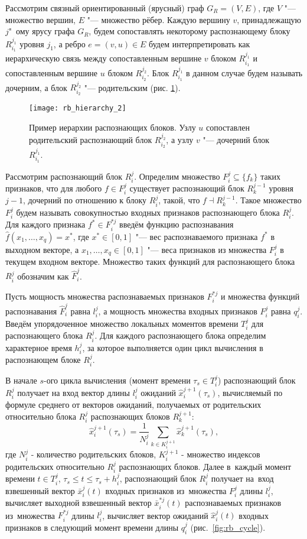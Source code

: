 Рассмотрим связный ориентированный (ярусный) граф $G_R=(V,E)$, где $V$ "--- множество вершин, $E$ "--- множество рёбер. Каждую вершину $v$, принадлежащую $j$"~ому ярусу графа $G_R$, будем сопоставлять некоторому распознающему блоку $R_{i_1}^{j_1}$ уровня $j_1$, а ребро $e=(v,u){\in}E$ будем интерпретировать как иерархическую связь между сопоставленным вершине $v$ блоком $R_{i_1}^{j_1 }$ и сопоставленным вершине $u$ блоком $R_{i_2}^{j_2}$. Блок $R_{i_1}^{j_1 }$ в данном случае будем называть дочерним, а блок $R_{i_2}^{j_2}$ "--- родительским (рис. \ref{fg:rb_hier}).

\begin{figure}[h]
	\centering
	\texttt{[image: rb\_hierarchy\_2]}
	\caption{Пример иерархии распознающих блоков. Узлу $u$ сопоставлен родительский распознающий блок $R_{i_2}^{j_2}$, а узлу $v$ "--- дочерний блок $R_{i_1}^{j_1}$.}
	\label{fg:rb_hier}
\end{figure}

Рассмотрим распознающий блок $R_i^j$. Определим множество $F_i^j{\subseteq}\{f_k\}$ таких признаков, что для любого $f{\in}F_i^j$ существует распознающий блок $R_k^{j-1}$ уровня $j-1$, дочерний по отношению к блоку $R_i^j$, такой, что $f{\dashv}R_k^{j-1}$. Такое множество $F_i^j$ будем называть совокупностью входных признаков распознающего блока $R_i^j$. Для каждого признака $f^*{\in}F_i^{*j}$ введём функцию распознавания $\hat{f}(x_1,\dots,x_q )=x^*$, где $x^*{\in}[0,1]$ "--- вес распознаваемого признака $f^*$ в выходном векторе, а $x_1,\dots,x_q{\in}[0,1]$ "--- веса признаков из множества $F_i^j$ в текущем входном векторе. Множество таких функций для распознающего блока $R_i^j$ обозначим как $\hat{F}_i^j$.

Пусть мощность множества распознаваемых признаков $F_i^{*j}$ и множества функций распознавания $\hat{F}_i^j$ равна $l_i^j$, а мощность множества входных признаков $F_i^j$ равна $q_i^j$. Введём упорядоченное множество локальных моментов времени $T_i^j$ для распознающего блока $R_i^j$. Для каждого распознающего блока определим характерное время $h_i^j$, за которое выполняется один цикл вычисления в распознающем блоке $R_i^j$. 

В начале $s$-ого цикла вычисления (момент времени $\tau_s\in{T_i^j}$)  распознающий блок $R_i^j$ получает на вход вектор длины $l_i^j$ ожиданий $\hat{x}_i^{j+1}(\tau_s)$, вычисляемый по формуле среднего от векторов ожиданий, получаемых от родительских относительно блока $R_i^j$ распознающих блоков $R_k^{j+1}$:
\[
\hat{x}_i^{j+1}(\tau_s)=\frac{1}{N_i^j}\sum_{k{\in}K_i^{j+1}}\hat{x}_k^{j+1}(\tau_s),
\]
где $N_i^j$ - количество родительских блоков, $K_i^{j+1}$ - множество индексов родительских относительно $R_i^j$ распознающих блоков. Далее в~каждый момент времени $t\in{T_i^j}$, $\tau_s\leqslant{t}\leqslant\tau_s+h_i^j$,  распознающий блок $R_i^j$ получает на~вход взвешенный вектор $\bar{x}_i^j(t)$ входных признаков из~множества $F_i^j$ длины $l_i^j$, вычисляет выходной взвешенный вектор $\bar{x}_i^{*j}(t)$ распознаваемых признаков из~множества $F_i^{*j}$ длины $l_i^j$, вычисляет вектор ожиданий $\hat{x}_i^j(t)$ входных признаков в следующий момент времени длины $q_i^j$ (рис.~\ref{fig:rb_cycle}).
	
